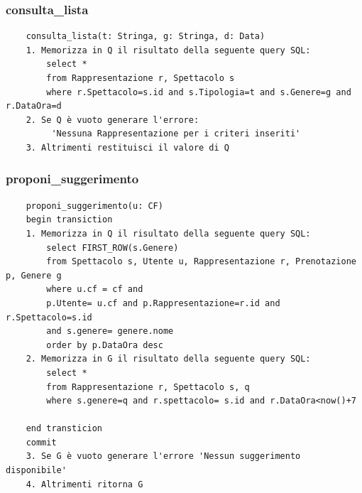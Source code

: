 \documentclass[12pt, letterpaper]{article}
\begin{document}
\subsubsection{consulta\_lista}
\begin{verbatim}
    consulta_lista(t: Stringa, g: Stringa, d: Data)
    1. Memorizza in Q il risultato della seguente query SQL:
        select *
        from Rappresentazione r, Spettacolo s
        where r.Spettacolo=s.id and s.Tipologia=t and s.Genere=g and r.DataOra=d
    2. Se Q è vuoto generare l'errore:
         'Nessuna Rappresentazione per i criteri inseriti'
    3. Altrimenti restituisci il valore di Q
\end{verbatim}\newpage
\subsubsection{proponi\_suggerimento}
\begin{verbatim}
    proponi_suggerimento(u: CF)
    begin transiction
    1. Memorizza in Q il risultato della seguente query SQL:
        select FIRST_ROW(s.Genere)
        from Spettacolo s, Utente u, Rappresentazione r, Prenotazione p, Genere g
        where u.cf = cf and 
        p.Utente= u.cf and p.Rappresentazione=r.id and r.Spettacolo=s.id
        and s.genere= genere.nome
        order by p.DataOra desc
    2. Memorizza in G il risultato della seguente query SQL:
        select *
        from Rappresentazione r, Spettacolo s, q
        where s.genere=q and r.spettacolo= s.id and r.DataOra<now()+7

    end transticion
    commit
    3. Se G è vuoto generare l'errore 'Nessun suggerimento disponibile'
    4. Altrimenti ritorna G

\end{verbatim}
\end{document}
